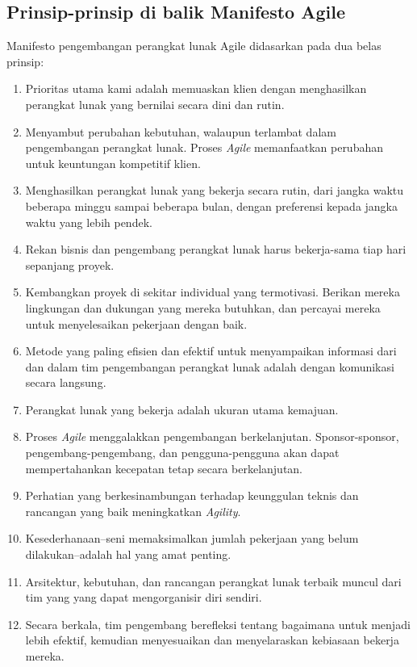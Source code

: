 \documentclass[a4paper, 12pt]{report}
\begin{document}
\subsection{Prinsip-prinsip di balik Manifesto Agile}
Manifesto pengembangan perangkat lunak Agile didasarkan pada dua belas prinsip:
\begin{enumerate}
  \item Prioritas utama kami adalah memuaskan klien dengan menghasilkan perangkat lunak yang bernilai secara dini dan rutin.
  \item Menyambut perubahan kebutuhan, walaupun terlambat dalam pengembangan perangkat lunak. Proses \textit{Agile} memanfaatkan perubahan untuk keuntungan kompetitif klien.
  \item Menghasilkan perangkat lunak yang bekerja secara rutin, dari jangka waktu beberapa minggu sampai beberapa bulan, dengan preferensi kepada jangka waktu yang lebih pendek.
  \item Rekan bisnis dan pengembang perangkat lunak harus bekerja-sama tiap hari sepanjang proyek.
  \item Kembangkan proyek di sekitar individual yang termotivasi. Berikan mereka lingkungan dan dukungan yang mereka butuhkan, dan percayai mereka untuk menyelesaikan pekerjaan dengan baik.
  \item Metode yang paling efisien dan efektif untuk menyampaikan informasi dari dan dalam tim pengembangan perangkat lunak adalah dengan komunikasi secara langsung.
  \item Perangkat lunak yang bekerja adalah ukuran utama kemajuan.
  \item Proses \textit{Agile} menggalakkan pengembangan berkelanjutan. Sponsor-sponsor, pengembang-pengembang, dan pengguna-pengguna akan dapat mempertahankan kecepatan tetap secara berkelanjutan.
  \item Perhatian yang berkesinambungan terhadap keunggulan teknis dan rancangan yang baik meningkatkan \textit{Agility}.
  \item Kesederhanaan--seni memaksimalkan jumlah pekerjaan yang belum dilakukan--adalah hal yang amat penting.
  \item Arsitektur, kebutuhan, dan rancangan perangkat lunak terbaik muncul dari tim yang yang dapat mengorganisir diri sendiri.
  \item Secara berkala, tim pengembang berefleksi tentang bagaimana untuk menjadi lebih efektif, kemudian menyesuaikan dan menyelaraskan kebiasaan bekerja mereka.
\end{enumerate}
\end{document}
